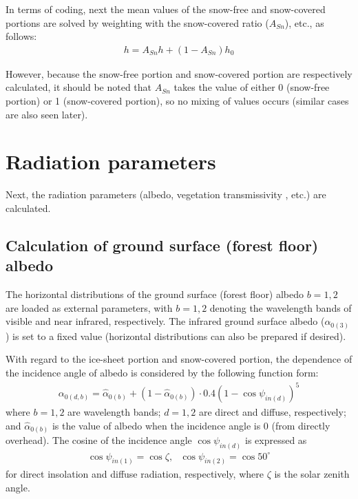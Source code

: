 In terms of coding, next the mean values of the snow-free and snow-covered portions are solved by weighting with the snow-covered ratio (\(A_{Sn}\)), etc., as follows: \begin{eqnarray}
    h = A_{Sn}h + (1-A_{Sn})h_0
\end{eqnarray}

However, because the snow-free portion and snow-covered portion are respectively calculated, it should be noted that \(A_{Sn}\) takes the value of either 0 (snow-free portion) or 1 (snow-covered
portion), so no mixing of values occurs (similar cases are also seen later).

\hypertarget{radiation-parameters}{%
\section{Radiation parameters}\label{radiation-parameters}}

Next, the radiation parameters (albedo, vegetation transmissivity , etc.) are calculated.

\hypertarget{calculation-of-ground-surface-forest-floor-albedo}{%
\subsection{Calculation of ground surface (forest floor) albedo}\label{calculation-of-ground-surface-forest-floor-albedo}}

The horizontal distributions of the ground surface (forest floor) albedo \(b=1,2\) are loaded as external parameters, with \(b=1,2\) denoting the wavelength bands of visible and near infrared,
respectively. The infrared ground surface albedo (\(\alpha_{0(3)}\)) is set to a fixed value (horizontal distributions can also be prepared if desired).

With regard to the ice-sheet portion and snow-covered portion, the dependence of the incidence angle of albedo is considered by the following function form: \begin{eqnarray}
 \alpha_{0(d,b)} = \hat{\alpha}_{0(b)} + ( 1 - \hat{\alpha}_{0(b)} )
                         \cdot 0.4 ( 1 - \cos \psi_{in(d)} )^5
\end{eqnarray} where \(b=1,2\) are wavelength bands; \(d=1,2\) are direct and diffuse, respectively; and \(\hat{\alpha}_{0(b)}\) is the value of albedo when the incidence angle is 0 (from directly overhead). The
cosine of the incidence angle \(\cos\psi_{in(d)}\) is expressed as \begin{eqnarray}
 \cos\psi_{in(1)} = \cos\zeta, \ \ \
 \cos\psi_{in(2)} = \cos 50^{\circ}
\end{eqnarray} for direct insolation and diffuse radiation, respectively, where \(\zeta\) is the solar zenith angle.


